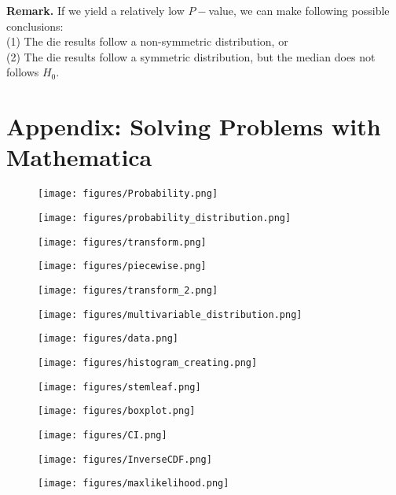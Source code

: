 \documentclass[a4paper,12pt]{article}
\begin{document}
\noindent \textbf{Remark.} If we yield a relatively low $P-$value, we can make following possible conclusions:\\
(1) The die results follow a non-symmetric distribution, or\\
(2) The die results follow a symmetric distribution, but the median does not follows $H_0$.


\section{Appendix: Solving Problems with Mathematica}

\begin{figure}[!h] 
    \centering
    \texttt{[image: figures/Probability.png]} 
\end{figure}
\begin{figure}[!h] 
    \centering
    \texttt{[image: figures/probability\_distribution.png]} 
\end{figure}
\begin{figure}[!h] 
    \centering
    \texttt{[image: figures/transform.png]} 
\end{figure}
\begin{figure}[!h] 
    \centering
    \texttt{[image: figures/piecewise.png]} 
\end{figure}
\begin{figure}[!h] 
    \centering
    \texttt{[image: figures/transform\_2.png]} 
\end{figure}
\begin{figure}[!h] 
    \centering
    \texttt{[image: figures/multivariable\_distribution.png]} 
\end{figure}


\begin{figure}[!h] 
    \centering
    \texttt{[image: figures/data.png]} 
\end{figure}
\begin{figure}[!h] 
    \centering
    \texttt{[image: figures/histogram\_creating.png]} 
\end{figure}
\begin{figure}[!h] 
    \centering
    \texttt{[image: figures/stemleaf.png]} 
\end{figure}
\begin{figure}[!h] 
    \centering
    \texttt{[image: figures/boxplot.png]} 
\end{figure}



\begin{figure}[!h] 
    \centering
    \texttt{[image: figures/CI.png]} 
\end{figure}
\begin{figure}[!h] 
    \centering
    \texttt{[image: figures/InverseCDF.png]} 
\end{figure}
\begin{figure}[!h] 
    \centering
    \texttt{[image: figures/maxlikelihood.png]} 
\end{figure}
\end{document}
